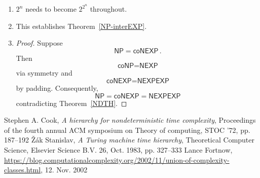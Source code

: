 \documentclass{article}
\theoremstyle{customstyle}
\newcommand{\NP}{\ensuremath{\textsf{NP}}}
\newcommand{\NEXP}{\ensuremath{\textsf{NEXP}}}
\newcommand{\NEXPEXP}{\ensuremath{\textsf{NEXPEXP}}}
\newcommand{\coNP}{\ensuremath{\textsf{coNP}}}
\newcommand{\coNEXP}{\ensuremath{\textsf{coNEXP}}}
\begin{document}
\begin{enumerate}
\item $2^n$ needs to become $2^{2^n}$ throughout.
\item This establishes Theorem~\ref{NP-interEXP}.
\item
\begin{proof}
Suppose
\[
\NP = \coNEXP\,.
\]
Then
\[
\coNP = \NEXP
\]
via symmetry and
\[
\coNEXP = \NEXPEXP
\]
by padding. Consequently,
\[
\NP = \coNEXP = \NEXPEXP
\]
contradicting Theorem~\ref{NDTH}.
\end{proof}
\end{enumerate}

\begin{thebibliography}{3}
Stephen A. Cook, \textit{A hierarchy for nondeterministic time complexity}, Proceedings of the fourth annual ACM symposium on Theory of computing, STOC '72, pp. 187--192
Žák Stanislav, \textit{A Turing machine time hierarchy}, Theoretical Computer Science, Elsevier Science B.V. 26, Oct. 1983, pp. 327--333
Lance Fortnow, \url{https://blog.computationalcomplexity.org/2002/11/union-of-complexity-classes.html}, 12. Nov. 2002
\end{thebibliography}

\vfill\eject
\end{document}
